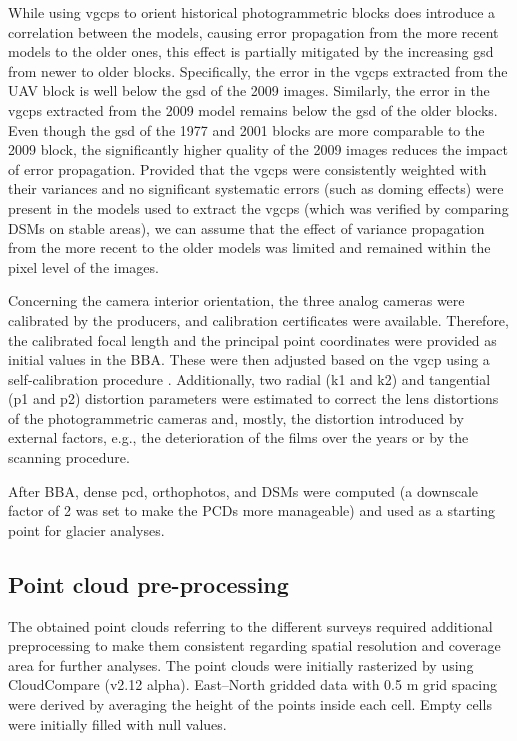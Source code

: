 While using \acp{vgcp} to orient historical photogrammetric blocks does introduce a correlation between the models, causing error propagation from the more recent models to the older ones, this effect is partially mitigated by the increasing \ac{gsd} from newer to older blocks.
Specifically, the error in the \acp{vgcp} extracted from the UAV block is well below the \ac{gsd} of the 2009 images. 
Similarly, the error in the \acp{vgcp} extracted from the 2009 model remains below the \ac{gsd} of the older blocks. 
Even though the \ac{gsd} of the 1977 and 2001 blocks are more comparable to the 2009 block, the significantly higher quality of the 2009 images reduces the impact of error propagation.
Provided that the \acp{vgcp} were consistently weighted with their variances and no significant systematic errors (such as doming effects) were present in the models used to extract the \acp{vgcp} (which was verified by comparing DSMs on stable areas), we can assume that the effect of variance propagation from the more recent to the older models was limited and remained within the pixel level of the images.

Concerning the camera interior orientation, the three analog cameras were calibrated by the producers, and calibration certificates were available. 
Therefore, the calibrated focal length and the principal point coordinates were provided as initial values in the BBA. 
These were then adjusted based on the {vgcp} using a self-calibration procedure \citep{jacobsen2004issues}. 
Additionally, two radial (k1 and k2) and tangential (p1 and p2) distortion parameters were estimated to correct the lens distortions of the photogrammetric cameras and, mostly, the distortion introduced by external factors, e.g., the deterioration of the films over the years or by the scanning procedure.

After BBA, dense \ac{pcd}, orthophotos, and DSMs were computed (a downscale factor of 2 was set to make the PCDs more manageable) and used as a starting point for glacier analyses.

\subsection{Point cloud pre-processing}\label{sec:2:pcd_preproc}

The obtained point clouds referring to the different surveys required additional preprocessing to make them consistent regarding spatial resolution and coverage area for further analyses.
The point clouds were initially rasterized by using CloudCompare (v2.12 alpha).
East–North gridded data with 0.5 m grid spacing were derived by averaging the height of the points inside each cell. 
Empty cells were initially filled with null values.

